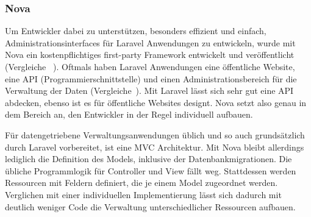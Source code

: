 \subsubsection{Nova}
Um Entwickler dabei zu unterstützen, besonders effizient und einfach, Administrationsinterfaces für Laravel Anwendungen zu entwickeln, wurde mit Nova ein kostenpflichtiges first-party Framework entwickelt und veröffentlicht (Vergleiche ~\cite{laravel-nova}).
Oftmals haben Laravel Anwendungen eine öffentliche Website, eine API (Programmierschnittstelle) und einen Administrationsbereich für die Verwaltung der Daten (Vergleiche~\cite{laravel-up-and-running}).
Mit Laravel lässt sich sehr gut eine API abdecken, ebenso ist es für öffentliche Websites designt.
Nova setzt also genau in dem Bereich an, den Entwickler in der Regel individuell aufbauen.

Für datengetriebene Verwaltungsanwendungen üblich und so auch grundsätzlich durch Laravel vorbereitet, ist eine MVC Architektur.
Mit Nova bleibt allerdings lediglich die Definition des Models, inklusive der Datenbankmigrationen.
Die übliche Programmlogik für Controller und View fällt weg.
Stattdessen werden Ressourcen mit Feldern definiert, die je einem Model zugeordnet werden.
Verglichen mit einer individuellen Implementierung lässt sich dadurch mit deutlich weniger Code die Verwaltung unterschiedlicher Ressourcen aufbauen.
